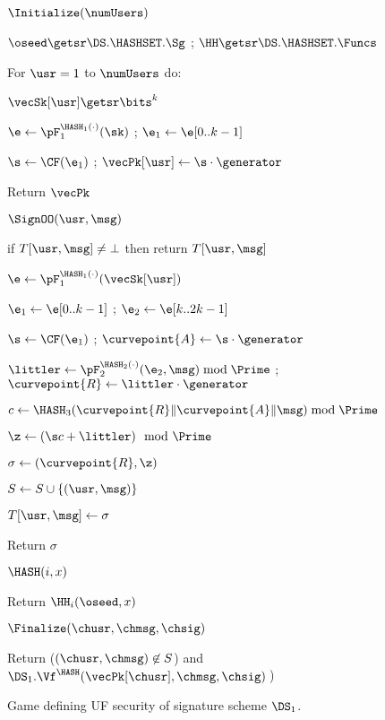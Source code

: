 \begin{figure}
{
	
	\begin{oracle}{$\Initialize(\numUsers)$}
		\item $\oseed\getsr\DS.\HASHSET.\Sg$ ; 
		$\HH \getsr \DS.\HASHSET.\Funcs$
		\item For $\usr=1$ to $\numUsers$ do:
		\item \quad $\vecSk[\usr] \getsr \bits^k$
		\item \quad $\e\gets \pF_1^{\HASH_1(\cdot)}(\sk)$ 
		; $\e_1 \gets \e[0..k-1]$ 
		\item \quad $\s \gets \CF(\e_1)$ ; $\vecPk[\usr] \gets \s\cdot \generator$
		\item Return $\vecPk$
	\end{oracle}
	\ExptSepSpace
	
	\begin{oracle}{$\SignOO(\usr, \msg)$}
		\item if $T[\usr, \msg] \neq \bot$ then return $T[\usr, \msg]$
		\item $\e\gets \pF_1^{\HASH_1(\cdot)}(\vecSk[\usr])$ 
		\item $\e_1 \gets \e[0..k-1]$ ; $\e_2 \gets \e[k..2k-1]$ 
		\item $\s \gets \CF(\e_1)$ ; $\curvepoint{A} \gets \s\cdot \generator$
		\item $\littler \gets \pF_2^{\HASH_2(\cdot)}(\e_2,\msg)\bmod \Prime$ 
		; $\curvepoint{R} \gets \littler\cdot \generator$
		\item $c \gets \HASH_3(\curvepoint{R}\|\curvepoint{A}\|\msg) \bmod \Prime$
		\item $\z \gets (\s c + \littler) \mod \Prime$
		\item $\sigma \gets (\curvepoint{R},\z)$
		\item $S \gets S \cup \{(\usr, \msg)\}$
		\item $T[\usr, \msg] \gets \sigma$
		\item Return $\sigma$
	\end{oracle}
	\ExptSepSpace
	
	\begin{oracle}{$\HASH(i,x)$}
		\item Return $\HH_i(\oseed,x)$
	\end{oracle}
	\ExptSepSpace
	
	\begin{oracle}{$\Finalize(\chusr, \chmsg, \chsig)$}
		\item Return ($(\chusr,\chmsg) \not\in S$) and $\DS_1.\Vf^{\HASH}(\vecPk[\chusr], \chmsg, \chsig)\:$) \vspace{2pt}
	\end{oracle}
}
\vspace{-5pt}
\caption{%
	Game defining UF security of signature scheme $\DS_1$.}
\label{fig:gm0}
\hrulefill
\vspace{-10pt}
\end{figure}

